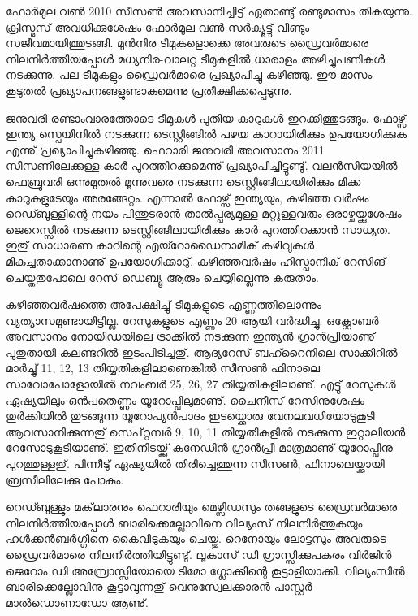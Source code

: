 ﻿
\vskip 2pt

ഫോര്‍മുല വണ്‍ 2010 സീസണ്‍ അവസാനിച്ചിട്ട് ഏതാണ്ടു് രണ്ടുമാസം തികയുന്നു. 
ക്രിസ്മസ് അവധിക്കുശേഷം ഫോര്‍മുല വണ്‍ സര്‍ക്യൂട്ടു് വീണ്ടും സജീവമായിത്തുടങ്ങി. മുന്‍നിര ടീമുകളൊക്കെ അവരുടെ ഡ്രൈവര്‍മാരെ 
നിലനിര്‍ത്തിയപ്പോള്‍ മധ്യനിര-വാലറ്റ ടീമുകളില്‍ ധാരാളം അഴിച്ചുപണികള്‍ നടക്കുന്നു. പല ടീമുകളും ഡ്രൈവര്‍മാരെ 
പ്രഖ്യാപിച്ചു കഴിഞ്ഞു. ഈ മാസം കൂടുതല്‍ പ്രഖ്യാപനങ്ങളുണ്ടാകുമെന്നു പ്രതീക്ഷിക്കപ്പെടുന്നു.

ജനുവരി രണ്ടാംവാരത്തോടെ ടീമുകള്‍ പുതിയ കാറുകള്‍ ഇറക്കിത്തുടങ്ങും. ഫോഴ്സ് ഇന്ത്യ സ്പെയിനില്‍ നടക്കുന്ന 
ടെസ്റ്റിങ്ങില്‍ പഴയ കാറായിരിക്കും ഉപയോഗിക്കുക എന്നു് പ്രഖ്യാപിച്ചുകഴിഞ്ഞു. ഫെറാരി ജനുവരി അവസാനം 2011 
സീസണിലേക്കുള്ള കാര്‍ പുറത്തിറക്കുമെന്നു് പ്രഖ്യാപിച്ചിട്ടുണ്ടു്. വലന്‍സിയയില്‍ ഫെബ്രുവരി ഒന്നുമുതല്‍ മൂന്നുവരെ 
നടക്കുന്ന ടെസ്റ്റിങ്ങിലായിരിക്കും മിക്ക കാറുകളുടേയും അരങ്ങേറ്റം. എന്നാല്‍ ഫോഴ്സ് ഇന്ത്യയും, കഴിഞ്ഞ വര്‍ഷം 
റെഡ്ബുള്ളിന്റെ നയം പിന്തുടരാന്‍ താല്‍പ്പര്യമുള്ള മറ്റുള്ളവരും ഒരാഴ്ചയ്ക്കുശേഷം ജെറെസ്സില്‍ നടക്കുന്ന 
ടെസ്റ്റിങ്ങിലായിരിക്കും കാര്‍ പുറത്തിറക്കാന്‍ സാധ്യത. ഇതു് സാധാരണ കാറിന്റെ എയ്റോഡൈനാമിക് കഴിവുകള്‍ 
മികച്ചതാക്കാനാണു് ഉപയോഗിക്കാറു്. കഴിഞ്ഞവര്‍ഷം ഹിസ്പാനിക് റേസിങ് ചെയ്തതുപോലെ റേസ് ഡെബ്യൂ ആരും 
ചെയ്യില്ലെന്നു കരുതാം.

കഴിഞ്ഞവര്‍ഷത്തെ അപേക്ഷിച്ചു് ടീമുകളുടെ എണ്ണത്തിലൊന്നും വ്യത്യാസമുണ്ടായിട്ടില്ല. റേസുകളുടെ എണ്ണം 20 
ആയി വര്‍ദ്ധിച്ചു. ഒക്റ്റോബര്‍ അവസാനം നോയിഡയിലെ ട്രാക്കില്‍ നടക്കുന്ന ഇന്ത്യന്‍ ഗ്രാന്‍പ്രിയാണു് പുതുതായി 
കലണ്ടറില്‍ ഇടംപിടിച്ചതു്. ആദ്യറേസ് ബഹ്റൈനിലെ സാക്കിറില്‍ മാര്‍ച്ചു് 11, 12, 13 തിയ്യതികളിലാണെങ്കില്‍ 
സീസണ്‍ ഫിനാലെ സാവോപോളോയില്‍ നവംബര്‍ 25, 26, 27 തിയ്യതികളിലാണു്. എട്ടു് റേസുകള്‍ ഏഷ്യയിലും 
ഒന്‍പതെണ്ണം യൂറോപ്പിലുമാണു്. ചൈനീസ് റേസിനുശേഷം തുര്‍ക്കിയില്‍ തുടങ്ങുന്ന യൂറോപ്യന്‍പാദം ഇടയ്ക്കൊരു 
വേനലവധിയോടുകൂടി ആവസാനിക്കുന്നതു് സെപ്റ്റമ്പര്‍ 9, 10, 11 തിയ്യതികളില്‍ നടക്കുന്ന ഇറ്റാലിയന്‍ 
റേസോടുകൂടിയാണു്. ഇതിനിടയ്ക്കു് കനേഡിന്‍ ഗ്രാന്‍പ്രീ മാത്രമാണു് യൂറോപ്പിനു പുറത്തുള്ളതു്. പിന്നീടു് ഏഷ്യയില്‍ 
തിരിച്ചെത്തുന്ന സീസണ്‍, ഫിനാലെയ്ക്കായി ബ്രസീലിലേക്കു പോകും.

റെഡ്ബുള്ളും മക്‌ലാരനും ഫെറാരിയും മെഴ്സിഡസും തങ്ങളുടെ ഡ്രൈവര്‍മാരെ നിലനിര്‍ത്തിയപ്പോള്‍  
ബാരിക്കെല്ലോവിനെ വില്യംസ് നിലനിര്‍ത്തുകയും ഹള്‍ക്കന്‍ബര്‍ഗ്ഗിനെ കൈവിടുകയും ചെയ്തു. റെനോയും ലോട്ടസും അവരുടെ 
ഡ്രൈവര്‍മാരെ നിലനിര്‍ത്തിയിട്ടുണ്ടു്. ലൂകാസ് ഡി ഗ്രാസ്സിക്കുപകരം വിര്‍ജിന്‍ ജെറോം ഡി അമ്പ്രോസ്സിയോയെ ടിമോ 
ഗ്ലോക്കിന്റെ കൂട്ടാളിയാക്കി. വില്യംസില്‍ ബാരിക്കെല്ലോവിനു കൂട്ടാവുന്നതു് വെനുസ്വേലക്കാരന്‍ പാസ്റ്റര്‍ 
മാല്‍ഡൊണാഡോ ആണു്.

